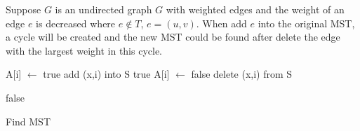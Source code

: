 \documentclass{assignment}
\begin{document}
    \newpage
    \begin{homeworkProblem}

Suppose $G$ is an undirected graph $G$ with weighted edges and the weight of an edge $e$ is decreased where $e \notin T$, $e=(u,v)$. When add $e$ into the original MST, a cycle will be created and the new MST could be found after delete the edge with the largest weight in this cycle.

 
     \begin{algorithm}[H]
 \BlankLine
{} {

 {
	 {
	A[i] $\leftarrow$ true\;
	add (x,i) into S\;
		 {
			\KwRet true}
	A[i] $\leftarrow$ false\;
		delete (x,i) from S\;
		}
	}

	\KwRet false\;
} 
\caption{Find MST} 
\end{algorithm}
    \end{homeworkProblem}
    \newpage
    
\end{document}
